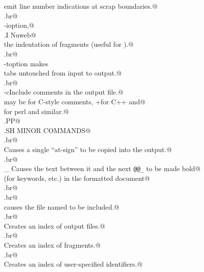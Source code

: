 \documentclass[a4paper]{report}
\begin{document}
\begin{flushleft}
\begin{list}{}{}
\mbox{}\verb@will emit line number indications at scrap boundaries.@\\
\mbox{}\verb@.br@\\
\mbox{}\verb@\fB-i\fR option,@\\
\mbox{}\verb@.I Nuweb@\\
\mbox{}\verb@supresses the indentation of fragments (useful for \fBFortran\fR).@\\
\mbox{}\verb@.br@\\
\mbox{}\verb@\fB-t\fP option makes \fInuweb\fP@\\
\mbox{}\verb@copy tabs untouched from input to output.@\\
\mbox{}\verb@.br@\\
\mbox{}\verb@\fB-c\fIx\fP Include comments in the output file.@\\
\mbox{}\verb@\fIx\fP may be \fBc\fP for C-style comments, \fB+\fP for C++ and@\\
\mbox{}\verb@\fBp\fP for perl and similar.@\\
\mbox{}\verb@.PP@\\
\mbox{}\verb@.SH MINOR COMMANDS@\\
\mbox{}\verb@.br@\\
\mbox{}\verb@    Causes a single ``at-sign'' to be copied into the output.@\\
\mbox{}\verb@.br@\\
\mbox{}\verb@\_    Causes the text between it and the next {\tt @{\tt @}\verb@\_} to be made bold@\\
\mbox{}\verb@        (for keywords, etc.) in the formatted document@\\
\mbox{}\verb@.br@\\
\mbox{}\verb@%     Comments out a line so that it doesn't appear in the output.@\\
\mbox{}\verb@.br@\\
\mbox{}\verb@i     \fBfilename\fR causes the file named to be included.@\\
\mbox{}\verb@.br@\\
\mbox{}\verb@f     Creates an index of output files.@\\
\mbox{}\verb@.br@\\
\mbox{}\verb@m     Creates an index of fragments.@\\
\mbox{}\verb@.br@\\
\mbox{}\verb@u     Creates an index of user-specified identifiers.@\\

\end{list}
\end{flushleft}
\end{document}
